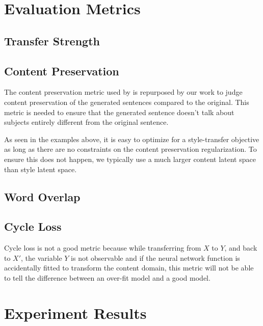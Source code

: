 \section{Evaluation Metrics}


\subsection{Transfer Strength}

\subsection{Content Preservation} \label{ssec:content-preservation-metric}

The content preservation metric used by \cite{fu2017style} is repurposed by our work to judge content preservation of the generated sentences compared to the original. This metric is needed to ensure that the generated sentence doesn't talk about subjects entirely different from the original sentence.


As seen in the examples above, it is easy to optimize for a style-transfer objective as long as there are no constraints on the content preservation regularization. To ensure this does not happen, we typically use a much larger content latent space than style latent space.

\subsection{Word Overlap}

\subsection{Cycle Loss}

Cycle loss is not a good metric because while transferring from $X$ to $Y$, and back to $X'$, the variable $Y$ is not observable and if the neural network function is accidentally fitted to transform the content domain, this metric will not be able to tell the difference between an over-fit model and a good model.

\section{Experiment Results}

